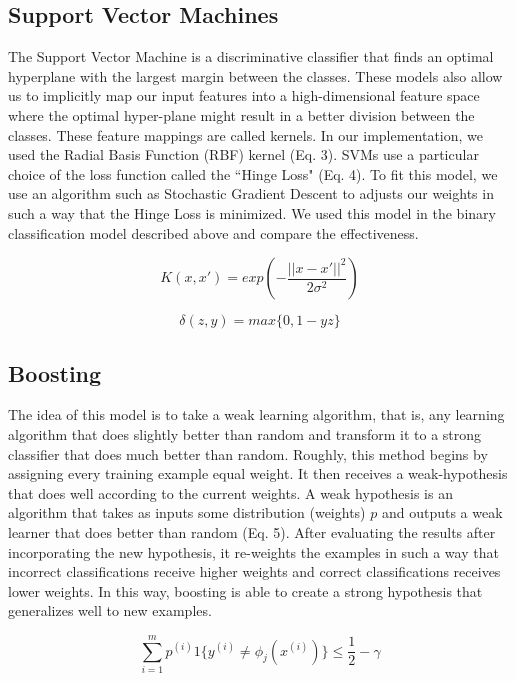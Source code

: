 \documentclass[conference]{IEEEtran}
\begin{document}
\subsection{Support Vector Machines}
The Support Vector Machine is a discriminative classifier that finds an optimal hyperplane  with the largest margin between the classes. These models also allow us to implicitly map our input features into a high-dimensional feature space where the optimal hyper-plane might result in a better division between the classes. These feature mappings are called kernels. In our implementation, we used the Radial Basis Function (RBF) kernel (Eq. 3). SVMs use a particular choice of the loss function called the ``Hinge Loss" (Eq. 4). To fit this model, we use an algorithm such as Stochastic Gradient Descent to adjusts our weights in such a way that the Hinge Loss is minimized. We used this model in the binary classification model described above and compare the effectiveness.

\begin{equation}
K(x,x') = exp (-\frac{||x-x'||^2}{2\sigma^2})
\end{equation}

\begin{equation}
\delta(z,y) = max \{0,1-yz\}
\end{equation}

\subsection{Boosting}
The idea of this model is to take a weak learning algorithm, that is, any learning algorithm that does slightly better than random and transform it to a strong classifier that does much better than random. Roughly, this method begins by assigning every training example equal weight. It then receives a weak-hypothesis that does well according to the current weights. A weak hypothesis is an algorithm that takes as inputs some distribution (weights) $p$ and outputs a weak learner that does better than random (Eq. 5). After evaluating the results after incorporating the new hypothesis, it re-weights the examples in such a way that incorrect classifications receive higher weights and correct classifications receives lower weights. In this way, boosting is able to create a strong hypothesis that generalizes well to new examples.

\begin{equation}
\sum_{i=1}^{m} p^{(i)} 1 \{y^{(i)} \neq \phi_j(x^{(i)})\}  \leq \frac{1}{2} - \gamma
\end{equation}
\end{document}
